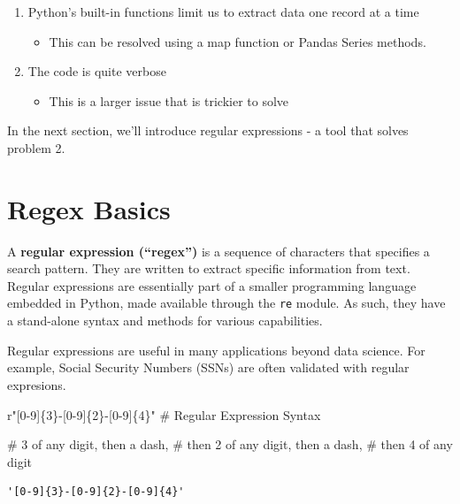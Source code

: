 \documentclass[
  letterpaper,
  DIV=11,
  numbers=noendperiod]{scrreprt}
\newenvironment{Shaded}{\begin{snugshade}}{\end{snugshade}}
\newcommand{\CommentTok}[1]{\textcolor[rgb]{0.37,0.37,0.37}{#1}}
\providecommand{\tightlist}{%
  \setlength{\itemsep}{0pt}\setlength{\parskip}{0pt}}\usepackage{longtable,booktabs,array}
\begin{document}
\begin{enumerate}
\def\labelenumi{\arabic{enumi}.}
\tightlist
\item
  Python's built-in functions limit us to extract data one record at a
  time

  \begin{itemize}
  \tightlist
  \item
    This can be resolved using a map function or Pandas Series methods.
  \end{itemize}
\item
  The code is quite verbose

  \begin{itemize}
  \tightlist
  \item
    This is a larger issue that is trickier to solve
  \end{itemize}
\end{enumerate}

In the next section, we'll introduce regular expressions - a tool that
solves problem 2.

\hypertarget{regex-basics}{%
\section{Regex Basics}\label{regex-basics}}

A \textbf{regular expression (``regex'')} is a sequence of characters
that specifies a search pattern. They are written to extract specific
information from text. Regular expressions are essentially part of a
smaller programming language embedded in Python, made available through
the \texttt{re} module. As such, they have a stand-alone syntax and
methods for various capabilities.

Regular expressions are useful in many applications beyond data science.
For example, Social Security Numbers (SSNs) are often validated with
regular expresions.

\begin{Shaded}
\begin{Highlighting}[]
\CommentTok{r"[0{-}9]\{3\}{-}[0{-}9]\{2\}{-}[0{-}9]\{4\}"} \CommentTok{\# Regular Expression Syntax}

\CommentTok{\# 3 of any digit, then a dash,}
\CommentTok{\# then 2 of any digit, then a dash,}
\CommentTok{\# then 4 of any digit}
\end{Highlighting}
\end{Shaded}

\begin{verbatim}
'[0-9]{3}-[0-9]{2}-[0-9]{4}'
\end{verbatim}
\end{document}
